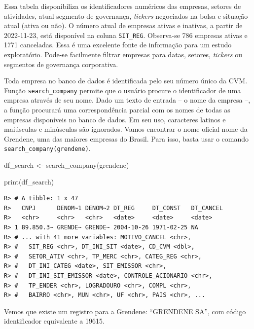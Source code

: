 \documentclass[
  11pt,
]{book}
\newenvironment{Shaded}{\begin{snugshade}}{\end{snugshade}}
\newcommand{\FunctionTok}[1]{\textcolor[rgb]{0,0,0}{#1}}
\newcommand{\NormalTok}[1]{#1}
\newcommand{\OtherTok}[1]{\textcolor[rgb]{0.37,0.37,0.37}{#1}}
\newcommand{\StringTok}[1]{\textcolor[rgb]{0.5,0.5,0.5}{#1}}
\begin{document}
Essa tabela disponibiliza os identificadores numéricos das empresas, setores de atividades, atual segmento de governança, \emph{tickers} negociados na bolsa e situação atual (ativa ou não). O número atual de empresas ativas e inativas, a partir de 2022-11-23, está disponível na coluna \texttt{SIT\_REG}. Observa-se 786 empresas ativas e 1771 canceladas. Essa é uma excelente fonte de informação para um estudo exploratório. Pode-se facilmente filtrar empresas para datas, setores, \emph{tickers} ou segmentos de governança corporativa.

Toda empresa no banco de dados é identificada pelo seu número único da CVM. Função \texttt{search\_company} permite que o usuário procure o identificador de uma empresa através de seu nome. Dado um texto de entrada -- o nome da empresa --, a função procurará uma correspondência parcial com os nomes de todas as empresas disponíveis no banco de dados. Em seu uso, caracteres latinos e maiúsculas e minúsculas são ignorados. Vamos encontrar o nome oficial nome da Grendene, uma das maiores empresas do Brasil. Para isso, basta usar o comando \texttt{search\_company(\textquotesingle{}grendene\textquotesingle{})}.

\begin{Shaded}
\begin{Highlighting}[]
\NormalTok{df\_search }\OtherTok{\textless{}{-}} \FunctionTok{search\_company}\NormalTok{(}\StringTok{\textquotesingle{}grendene\textquotesingle{}}\NormalTok{)}

\FunctionTok{print}\NormalTok{(df\_search)}
\end{Highlighting}
\end{Shaded}

\begin{verbatim}
R> # A tibble: 1 x 47
R>   CNPJ      DENOM~1 DENOM~2 DT_REG     DT_CONST   DT_CANCEL
R>   <chr>     <chr>   <chr>   <date>     <date>     <date>   
R> 1 89.850.3~ GRENDE~ GRENDE~ 2004-10-26 1971-02-25 NA       
R> # ... with 41 more variables: MOTIVO_CANCEL <chr>,
R> #   SIT_REG <chr>, DT_INI_SIT <date>, CD_CVM <dbl>,
R> #   SETOR_ATIV <chr>, TP_MERC <chr>, CATEG_REG <chr>,
R> #   DT_INI_CATEG <date>, SIT_EMISSOR <chr>,
R> #   DT_INI_SIT_EMISSOR <date>, CONTROLE_ACIONARIO <chr>,
R> #   TP_ENDER <chr>, LOGRADOURO <chr>, COMPL <chr>,
R> #   BAIRRO <chr>, MUN <chr>, UF <chr>, PAIS <chr>, ...
\end{verbatim}

Vemos que existe um registro para a Grendene: ``GRENDENE SA'', com código identificador equivalente a 19615. 
\end{document}
